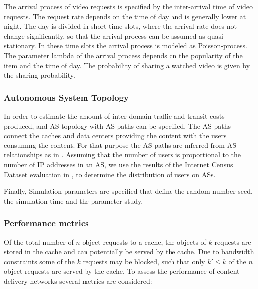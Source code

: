 The arrival process of video requests is specified by the inter-arrival time of video requests.
The request rate depends on the time of day and is generally lower at night.
The day is divided in short time slots, where the arrival rate does not change significantly, so that the arrival process can be assumed as quasi stationary.
In these time slots the arrival process is modeled as Poisson-process.
The parameter lambda of the arrival process depends on the popularity of the item and the time of day.
The probability of sharing a watched video is given by the sharing probability.

\subsubsection{Autonomous System Topology}
In order to estimate the amount of inter-domain traffic and transit costs produced, and AS topology with AS paths can be specified.
The AS paths connect the caches and data centers providing the content with the users consuming the content.
For that purpose the AS paths are inferred from AS relationships as in .
Assuming that the number of users is proportional to the number of IP addresses in an AS, we use the results of the Internet Census Dataset evaluation in , to determine the distribution of users on ASs.

Finally, Simulation parameters are specified that define the random number seed, the simulation time and the parameter study.

\subsubsection{Performance metrics}

Of the total number of $n$ object requests to a cache, the objects of $k$ requests are stored in the cache and can potentially be served by the cache.
Due to bandwidth constraints some of the $k$ requests may be blocked, such that only $k'\leq k$ of the $n$ object requests are served by the cache.
To assess the performance of content delivery networks several metrics are considered:

